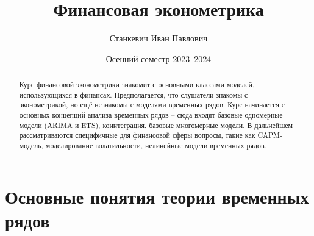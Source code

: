 \documentclass[
    russian
    ]{vegalectures}
\title{Финансовая эконометрика}
\author{Станкевич Иван Павлович}
\date{Осенний семестр 2023--2024}
\begin{document}
    \maketitle

    \begin{abstract}
        Курс финансовой эконометрики знакомит с основными классами моделей, использующихся в финансах. Предполагается, что слушатели знакомы с эконометрикой, но ещё незнакомы с моделями временных рядов. Курс начинается с основных концепций анализа временных рядов -- сюда входят базовые одномерные модели (ARIMA и ETS), коинтеграция, базовые многомерные модели. В дальнейшем рассматриваются специфичные для финансовой сферы вопросы, такие как CAPM-модель, моделирование волатильности, нелинейные модели временных рядов.
    \end{abstract}

    \tableofcontents

    \section{Основные понятия теории временных рядов}
    
    
    
    
    

    \newpage\clearpage
    
        
\end{document}

